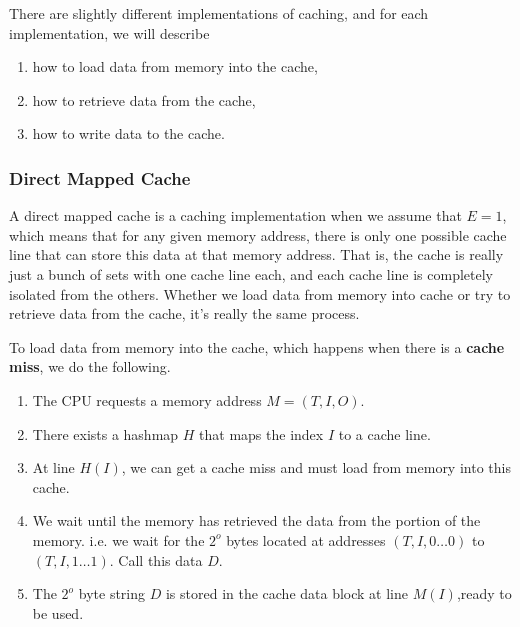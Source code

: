     There are slightly different implementations of caching, and for each implementation, we will describe 
    \begin{enumerate}
      \item how to load data from memory into the cache, 
      \item how to retrieve data from the cache, 
      \item how to write data to the cache. 
    \end{enumerate}

  \subsubsection{Direct Mapped Cache} 

    A direct mapped cache is a caching implementation when we assume that $E = 1$, which means that for any given memory address, there is only one possible cache line that can store this data at that memory address. That is, the cache is really just a bunch of sets with one cache line each, and each cache line is completely isolated from the others. Whether we load data from memory into cache or try to retrieve data from the cache, it's really the same process. 

    \begin{theorem}[Placement]
      To load data from memory into the cache, which happens when there is a \textbf{cache miss}, we do the following. 
      \begin{enumerate}
        \item The CPU requests a memory address $M = (T, I, O)$. 
        \item There exists a hashmap $H$ that maps the index $I$ to a cache line. 
        \item At line $H(I)$, we can get a cache miss and must load from memory into this cache. 
        \item We wait until the memory has retrieved the data from the portion of the memory. i.e. we wait for the $2^o$ bytes located at addresses $(T, I, 0\ldots 0)$ to $(T, I, 1\ldots 1)$. Call this data $D$. 
        \item The $2^o$ byte string $D$ is stored in the cache data block at line $M(I)$,ready to be used. 
      \end{enumerate}
    \end{theorem}

